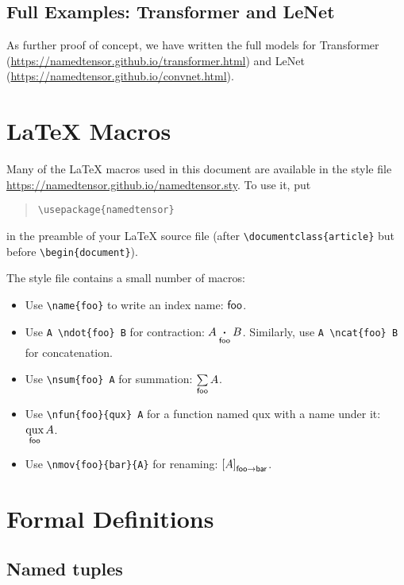 \documentclass{article}
\begin{document}
\subsection{Full Examples: Transformer and LeNet}

As further proof of concept, we have written the full models for Transformer (\url{https://namedtensor.github.io/transformer.html}) and LeNet (\url{https://namedtensor.github.io/convnet.html}).

\section{\LaTeX{} Macros}

Many of the \LaTeX{} macros used in this document are available in the style file \url{https://namedtensor.github.io/namedtensor.sty}. To use it, put
\begin{quote}
\begin{verbatim}
\usepackage{namedtensor}
\end{verbatim}
\end{quote}
in the preamble of your \LaTeX{} source file (after \verb|\documentclass{article}| but before \verb|\begin{document}|).

The style file contains a small number of macros:
\begin{itemize}
\item Use \verb|\name{foo}| to write an index name: $\name{foo}$.
\item Use \verb|A \ndot{foo} B| for contraction: $A \ndot{foo} B$. Similarly, use \verb|A \ncat{foo} B| for concatenation.
\item Use \verb|\nsum{foo} A| for summation: $\nsum{foo} A$.
\item Use \verb|\nfun{foo}{qux} A| for a function named qux with a name under it: $\nfun{foo}{qux} A$.
\item Use \verb|\nmov{foo}{bar}{A}| for renaming: $\nmov{foo}{bar}{A}$.
\end{itemize}

\section{Formal Definitions}
\label{sec:definitions}

\newcommand{\sub}[1]{_\text{$#1$}}

\subsection{Named tuples}
\end{document}
